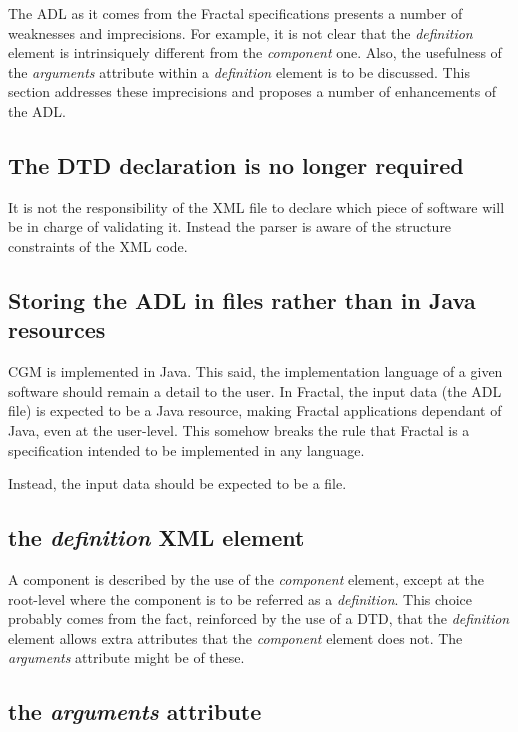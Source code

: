 \documentclass{article}
\newcommand{\xml}[1]{\textsl{#1}}
\begin{document}
The ADL as it comes from the Fractal specifications presents a number of weaknesses and imprecisions.
For example, it is not clear that the \xml{definition} element is intrinsiquely different from the \xml{component} one.
Also, the usefulness of the \xml{arguments} attribute within a \xml{definition} element is to be discussed.
This section addresses these imprecisions and proposes a number of enhancements of the ADL.


\subsection{The DTD declaration is no longer required}

It is not the responsibility of the XML file to declare which piece of software
will be in charge of validating it.
Instead the parser is aware of the structure constraints of the XML code.

\subsection{Storing the ADL in files rather than in Java resources}

CGM is implemented in Java. This said, the implementation language of a given software
should remain a detail to the user. In Fractal, the input data (the ADL file) is expected
to be a Java resource, making Fractal applications dependant of Java, even at the user-level. This somehow breaks the rule
that Fractal is a specification intended to be implemented in any language.

Instead, the input data should be expected to be a file.


\subsection{the \xml{definition} XML element}

A component is described by the use of the \xml{component} element, except at the root-level
where the component is to be referred as a  \xml{definition}. This choice probably comes
from the fact, reinforced by the use of a DTD, that the \xml{definition} element allows
extra attributes that the \xml{component} element does not. The \xml{arguments}  
attribute might be of these.


\subsection{the \xml{arguments} attribute}
\end{document}
